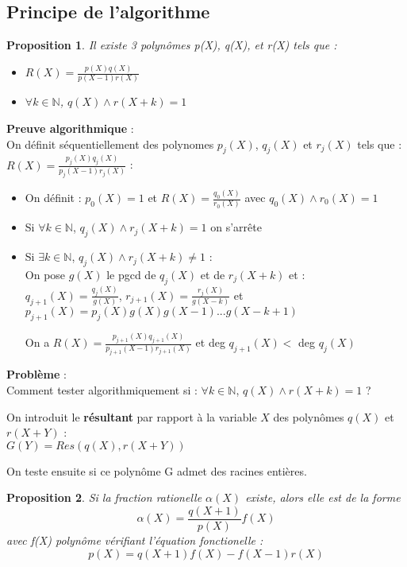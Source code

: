 \documentclass[17 pt]{scrartcl}
\newtheorem{prop}{Proposition}
\begin{document}
	\subsection*{Principe de l'algorithme}
	\begin{prop}
		Il existe 3 polynômes p(X), q(X), et r(X) tels que : 
		\begin{itemize}
		 \item $R(X) = \frac{p(X)q(X)}{p(X-1)r(X)}$
	 	 \item $\forall k \in \mathbb{N}$, $q(X) \wedge r(X+k) = 1 $
	 \end{itemize}
	\end{prop}
	\textbf{Preuve algorithmique} : \\
	On définit séquentiellement des polynomes $p_j(X)$, $q_j(X)$ et $r_j(X)$ tels que : $R(X) = \frac{p_j(X)q_j(X)}{p_j(X-1)r_j(X)}$ : 
		\begin{itemize}
		\item On définit : $p_0(X) = 1$ et $R(X) = \frac{q_0(X)}{r_0(X)} $ avec $q_0(X) \wedge r_0(X) = 1$ 
		\item Si $\forall k \in \mathbb{N}$, $q_j(X) \wedge r_j(X+k) = 1 $ on s'arrête
		\item Si $\exists k \in \mathbb{N}$, $q_j(X) \wedge r_j(X+k) \neq 1 $ : \\
		On pose $g(X)$ le pgcd de $q_j(X)$ et de $r_j(X+k)$ et : \\
		$q_{j+1}(X) = \frac{q_j(X)}{g(X)}$, $r_{j+1}(X) = \frac{r_j(X)}{g(X-k)}$ et \\$p_{j+1}(X) = p_j(X)g(X)g(X-1)...g(X-k+1)$
		
		On a $R(X) = \frac{p_{j+1}(X)q_{j+1}(X)}{p_{j+1}(X-1)r_{j+1}(X)}$ et deg $q_{j+1}(X) < $ deg $q_{j}(X)$
		\end{itemize}
		
		
\textbf{Problème} : \\
Comment tester algorithmiquement si :  $\forall k \in \mathbb{N}$, $q(X) \wedge r(X+k) = 1 $ ?
	
On introduit le \textbf{résultant} par rapport à la variable $X$ des polynômes $q(X)$ et $r(X+Y)$ : \\$G(Y) = Res(q(X), r(X+Y))$ 

On teste ensuite si ce polynôme G admet des racines entières.

	\begin{prop}
		Si la fraction rationelle $\alpha(X)$ existe, alors elle est de la forme 
			$$\alpha(X) = \frac{q(X+1)}{p(X)}f(X)$$
	    avec f(X) polynôme vérifiant l'équation fonctionelle : 
	        $$p(X) = q(X+1)f(X)-f(X-1)r(X)$$
	\end{prop}
	
\end{document}
